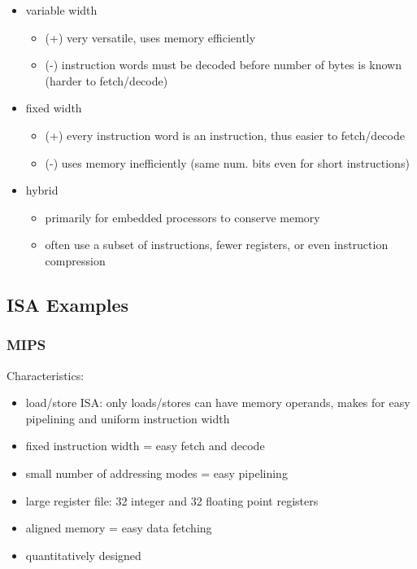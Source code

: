 \documentclass[12pt]{extarticle}
\begin{document}
	\begin{itemize}
		\item variable width
		\begin{itemize}
			\item (+) very versatile, uses memory efficiently
			\item (-) instruction words must be decoded before number of bytes is known (harder to fetch/decode)
		\end{itemize}

		\item fixed width
		\begin{itemize}
			\item (+) every instruction word is an instruction, thus easier to fetch/decode
			\item (-) uses memory inefficiently (same num. bits even for short instructions)
		\end{itemize}

		\item hybrid
		\begin{itemize}
			\item primarily for embedded processors to conserve memory
			\item often use a subset of instructions, fewer registers, or even instruction compression
		\end{itemize}
	\end{itemize}

	\subsection{ISA Examples}

	\subsubsection{MIPS}

	Characteristics:

	\begin{itemize}
		\item load/store ISA: only loads/stores can have memory operands, makes for easy pipelining and uniform instruction width
		\item fixed instruction width = easy fetch and decode
		\item small number of addressing modes = easy pipelining
		\item large register file: 32 integer and 32 floating point registers
		\item aligned memory = easy data fetching
		\item quantitatively designed
	\end{itemize}
\end{document}
